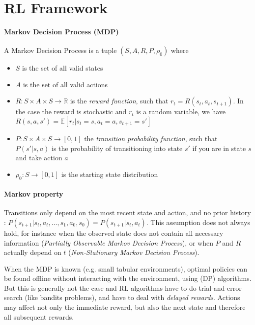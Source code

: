 \section{RL Framework}

\paragraph{Markov Decision Process (MDP)}
A Markov Decision Process is a tuple $(S, A, R, P, \rho_0)$ where 
\begin{itemize}
    \item $S$ is the set of all valid states
    \item $A$ is the set of all valid actions
    \item $R: S \times A \times S \rightarrow \mathbb{R}$ is the \emph{reward function}, such that $r_t = R(s_t, a_t, s_{t+1})$. In the case the reward is stochastic and $r_t$ is a random variable, we have $R(s, a, s') = \mathbb{E}[r_t | s_t=s, a_t=a, s_{t+1}=s']$
    \item $P: S \times A \times S \rightarrow [0, 1]$ the \emph{transition probability function}, such that $P(s' | s, a)$ is the probability of transitioning into state $s'$ if you are in state $s$ and take action $a$
    \item $\rho_0: S \rightarrow [0, 1]$ is the starting state distribution
\end{itemize}

\paragraph{Markov property} Transitions only depend on the most recent state and action, and no prior history : $P(s_{t+1}|s_t,a_t,\dots,s_1,a_0,s_0) = P(s_{t+1}|s_t,a_t)$. This assumption does not always hold, for instance when the observed state does not contain all necessary information (\emph{Partially Observable Markov Decision Process}), or when $P$ and $R$ actually depend on $t$ (\emph{Non-Stationary Markov Decision Process}).

When the MDP is known (e.g. small tabular environments), optimal policies can be found offline without interacting with the environment, using  (DP) algorithms. But this is generally not the case and RL algorithms have to do trial-and-error search (like bandits problems), and have to deal with \emph{delayed rewards}. Actions may affect not only the immediate reward, but also the next state and therefore all subsequent rewards.

